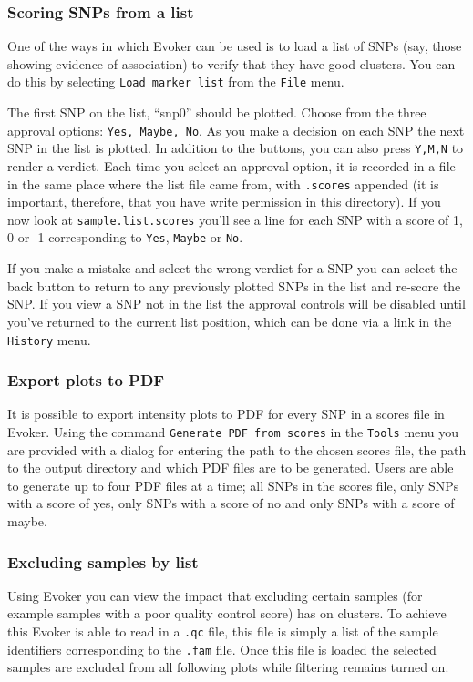 \documentclass{article}
\begin{document}
\subsubsection{Scoring SNPs from a list}

One of the ways in which Evoker can be used is to load a list of SNPs (say, those showing evidence of association) to verify that they have good clusters. You can do this by selecting \texttt{Load marker list} from the \texttt{File} menu.

The first SNP on the list, ``snp0'' should be plotted. Choose from the three approval options: \texttt{Yes, Maybe, No}. As you make a decision on each SNP the next SNP in the list is plotted. In addition to the buttons, you can also press \texttt{Y,M,N} to render a verdict. Each time you select an approval option, it is recorded in a file in the same place where the list file came from, with \texttt{.scores} appended (it is important, therefore, that you have write permission in this directory). If you now look at \texttt{sample.list.scores} you'll see a line for each SNP with a score of 1, 0 or -1 corresponding to \texttt{Yes}, \texttt{Maybe} or \texttt{No}. 

If you make a mistake and select the wrong verdict for a SNP you can select the back button to return to any previously plotted SNPs in the list and re-score the SNP. If you view a SNP not in the list the approval controls will be disabled until you've returned to the current list position, which can be done via a link in the \texttt{History} menu.

\subsubsection{Export plots to PDF}

It is possible to export intensity plots to PDF for every SNP in a scores file in Evoker. Using the command \texttt{Generate PDF from scores} in the \texttt{Tools} menu you are provided with a dialog for entering the path to the chosen scores file, the path to the output directory and which PDF files are to be generated. Users are able to generate up to four PDF files at a time; all SNPs in the scores file, only SNPs with a score of yes, only SNPs with a score of no and only SNPs with a score of maybe.  

\subsubsection{Excluding samples by list}
Using Evoker you can view the impact that excluding certain samples (for example samples with a poor quality control score) has on clusters. To achieve this Evoker is able to read in a \texttt{.qc} file, this file is simply a list of the sample identifiers corresponding to the \texttt{.fam} file. Once this file is loaded the selected samples are excluded from all following plots while filtering remains turned on.
\end{document}
